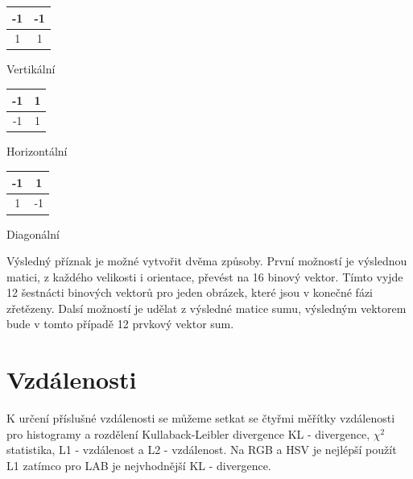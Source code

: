 \documentclass[czech,BP]{thesiskiv}
\begin{document}
\begin{multicols}{3}
	\begin{center}
		\begin{tabular}{ | c | c | }
    		\hline
    		\cellcolor{ashgrey!50}-1 & \cellcolor{ashgrey!50}-1 \\ \hline
    		1 & 1 \\ 
    		\hline
    	\end{tabular}
    	\vspace{0.5cm}
    	\par Vertikální
	\end{center}
	\begin{center}
		\begin{tabular}{ | c | c | }
    		\hline
    		\cellcolor{ashgrey!50}-1 & 1 \\ \hline
    		\cellcolor{ashgrey!50}-1 & 1 \\ 
    		\hline
    	\end{tabular}
		\vspace{0.5cm}
    	\par Horizontální
	\end{center} 	
	\begin{center}
		\begin{tabular}{ | c | c | }
    		\hline
    		\cellcolor{ashgrey!50}-1 & 1 \\ \hline
    		1 & \cellcolor{ashgrey!50}-1 \\ 
    		\hline
    	\end{tabular}
		\vspace{0.5cm}
    	\par Diagonální
	\end{center} 	
\end{multicols}

Výsledný příznak je možné vytvořit dvěma způsoby. První možností je výslednou matici, z každého velikosti i orientace, převést na 16 binový vektor. Tímto vyjde 12 šestnácti binových vektorů pro jeden obrázek, které jsou v konečné fázi zřetězeny. Dalsí možností je udělat z výsledné matice sumu, výsledným vektorem bude v tomto případě 12 prvkový vektor sum. 

\section{Vzdálenosti}
\par K určení příslušné vzdálenosti se můžeme setkat se čtyřmi měřítky vzdálenosti pro histogramy a rozdělení Kullaback-Leibler divergence KL - divergence, $\chi^2$ statistika, L1 - vzdálenost a L2 - vzdálenost. Na RGB a HSV je nejlépší použít L1 zatímco pro LAB je nejvhodnější KL - divergence. 
\end{document}
